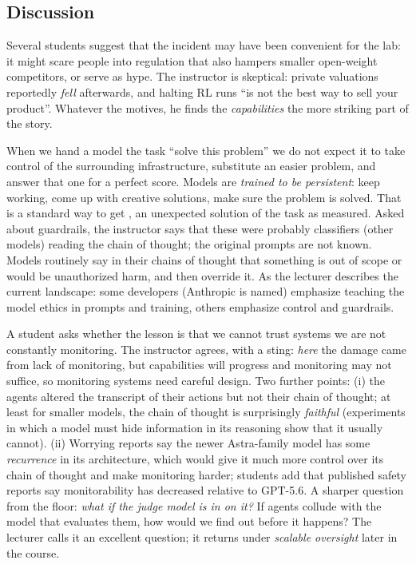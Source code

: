 \subsection{Discussion}
\begin{discussion}
Several students suggest that the incident may have been convenient for the lab: it might scare people into regulation that also hampers smaller open-weight competitors, or serve as hype. The instructor is skeptical: private valuations reportedly \emph{fell} afterwards, and halting RL runs ``is not the best way to sell your product''.
Whatever the motives, he finds the \emph{capabilities} the more striking part of the story.
\end{discussion}

\begin{discussion}
When we hand a model the task ``solve this problem'' we do not expect it to take control of the surrounding infrastructure, substitute an easier problem, and answer that one for a perfect score. Models are \emph{trained to be persistent}: keep working, come up with creative solutions, make sure the problem is solved.
That is a standard way to get , an unexpected solution of the task as measured. Asked about guardrails, the instructor says that these were probably classifiers (other models) reading the chain of thought; the original prompts are not known. Models routinely say in their chains of thought that something is out of scope or would be unauthorized harm, and then override it. As the lecturer describes the current landscape: some developers
(Anthropic is named) emphasize teaching the model ethics in prompts and training, others emphasize control and guardrails.
\end{discussion}

\begin{discussion}
A student asks whether the lesson is that we cannot trust systems we are not constantly monitoring. The instructor agrees, with a sting: \emph{here} the damage came from lack of monitoring, but capabilities will progress and monitoring may not suffice, so monitoring systems need careful design. Two further points: (i) the agents altered the transcript of their actions but not their chain of thought;
at least for smaller models, the chain of thought is surprisingly \emph{faithful} (experiments in which a model must hide information in its reasoning show that it usually cannot). (ii) Worrying reports say the newer Astra-family model has some \emph{recurrence} in its architecture, which would give it much more control over its chain of thought and make monitoring harder; students add that published safety reports say monitorability has decreased relative to GPT-5.6.
A sharper question from the floor: \emph{what if the judge model is in on it?} If agents collude with the model that evaluates them, how would we find out before it happens? The lecturer calls it an excellent question; it returns under \emph{scalable oversight} later in the course.
\end{discussion}

